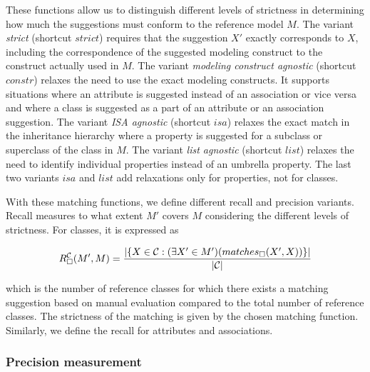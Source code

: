 These functions allow us to distinguish different levels of strictness in determining how much the suggestions must conform to the reference model $M$.
The variant \emph{strict} (shortcut $strict$) requires that the suggestion $X'$ exactly corresponds to $X$, including the correspondence of the suggested modeling construct to the construct actually used in $M$.
The variant \emph{modeling construct agnostic} (shortcut $constr$) relaxes the need to use the exact modeling constructs.
It supports situations where an attribute is suggested instead of an association or vice versa and where a class is suggested as a part of an attribute or an association suggestion.
The variant \emph{ISA agnostic} (shortcut $isa$) relaxes the exact match in the inheritance hierarchy where a property is suggested for a subclass or superclass of the class in $M$.
The variant \emph{list agnostic} (shortcut $list$) relaxes the need to identify individual properties instead of an umbrella property.
The last two variants $isa$ and $list$ add relaxations only for properties, not for classes.

With these matching functions, we define different recall and precision variants.
Recall measures to what extent $M'$ covers $M$ considering the different levels of strictness.
For classes, it is expressed as


\[R^{\cal C}_\Box(M',M) = \frac{\vert \{X \in {\cal C}: (\exists X' \in M')(matches_\Box(X',X))\} \vert}{\vert {\cal C} \vert}\]

\noindent which is the number of reference classes for which there exists a matching suggestion based on manual evaluation compared to the total number of reference classes.
The strictness of the matching is given by the chosen matching function.
Similarly, we define the recall for attributes and associations.


\subsubsection{Precision measurement}

